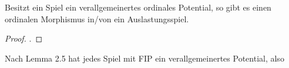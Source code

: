 \begin{beob}
	Besitzt ein Spiel ein verallgemeinertes ordinales Potential, so gibt es einen ordinalen Morphismus in/von  ein Auslastungsspiel.
\end{beob}

\begin{proof}
	.
\end{proof}

\begin{beob}
	Nach \cite{MonShap} Lemma 2.5 hat jedes Spiel mit FIP ein verallgemeinertes Potential, also 
\end{beob}
